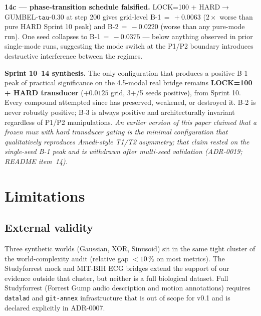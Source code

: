 \documentclass{article}
\begin{document}
\textbf{14c --- phase-transition schedule falsified.}
LOCK=100 + HARD$\to$GUMBEL-$\mathtt{tau}$-$0.30$ at step 200 gives
grid-level B-1$\,=\,+0.0063$ ($2\times$ worse than pure HARD
Sprint 10 peak) and B-2$\,=\,-0.0220$ (worse than any pure-mode
run). One seed collapses to B-1$\,=\,-0.0375$ --- below anything
observed in prior single-mode runs, suggesting the mode switch at
the P1/P2 boundary introduces destructive interference between
the regimes.

\textbf{Sprint 10--14 synthesis.} The only configuration that
produces a positive B-1 peak of practical significance on the
4.5-modal real bridge remains \textbf{LOCK=100 + HARD transducer}
($+0.0125$ grid, 3+/5 seeds positive), from Sprint 10. Every
compound attempted since has preserved, weakened, or destroyed it.
B-2 is never robustly positive; B-3 is always positive and
architecturally invariant regardless of P1/P2 manipulations.
\emph{An earlier version of this paper claimed that a frozen
mux with hard transducer gating is the minimal configuration that
qualitatively reproduces Amedi-style T1/T2 asymmetry; that claim
rested on the single-seed B-1 peak and is withdrawn after
multi-seed validation (ADR-0019; README item~14).}


\section{Limitations}
\label{sec:limitations}

\subsection{External validity}

Three synthetic worlds (Gaussian, XOR, Sinusoid) sit in the same
tight cluster of the world-complexity audit (relative gap
$< 10\,\%$ on most metrics). The Studyforrest mock and MIT-BIH ECG
bridges extend the support of our evidence outside that cluster,
but neither is a full biological dataset. Full Studyforrest
(Forrest Gump audio description and motion annotations) requires
\texttt{datalad} and \texttt{git-annex} infrastructure that is
out of scope for v0.1 and is declared explicitly in ADR-0007.
\end{document}
